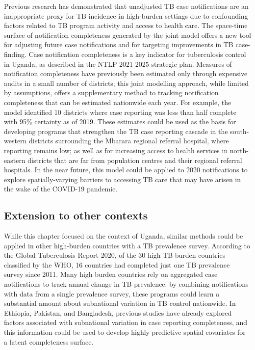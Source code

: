 \documentclass[
]{report}
\begin{document}
Previous research has demonstrated that unadjusted TB case notifications are an inappropriate proxy for TB incidence in high-burden settings due to confounding factors related to TB program activity and access to health care.\autocite{Rood2019,Shaweno2018} The space-time surface of notification completeness generated by the joint model offers a new tool for adjusting future case notifications and for targeting improvements in TB case-finding. Case notification completeness is a key indicator for tuberculosis control in Uganda, as described in the NTLP 2021-2025 strategic plan.\autocite{UgandaNationalTuberculosisandLeprosyProgramme2020a} Measures of notification completeness have previously been estimated only through expensive audits in a small number of districts; this joint modelling approach, while limited by assumptions, offers a supplementary method to tracking notification completeness that can be estimated nationwide each year. For example, the model identified 10 districts where case reporting was less than half complete with 95\% certainty as of 2019. These estimates could be used as the basis for developing programs that strengthen the TB case reporting cascade in the south-western districts surrounding the Mbarara regional referral hospital, where reporting remains low; as well as for increasing access to health services in north-eastern districts that are far from population centres and their regional referral hospitals. In the near future, this model could be applied to 2020 notifications to explore spatially-varying barriers to accessing TB care that may have arisen in the wake of the COVID-19 pandemic.\autocite{Togun2020}

\hypertarget{extension-to-other-contexts}{%
\subsection{Extension to other contexts}\label{extension-to-other-contexts}}

While this chapter focused on the context of Uganda, similar methods could be applied in other high-burden countries with a TB prevalence survey. According to the Global Tuberculosis Report 2020, of the 30 high TB burden countries classified by the WHO, 16 countries had completed just one TB prevalence survey since 2011.\autocite{WorldHealthOrganization2020a} Many high burden countries rely on aggregated case notifications to track annual change in TB prevalence: by combining notifications with data from a single prevalence survey, these programs could learn a substantial amount about subnational variation in TB control nationwide. In Ethiopia, Pakistan, and Bangladesh, previous studies have already explored factors associated with subnational variation in case reporting completeness, and this information could be used to develop highly predictive spatial covariates for a latent completeness surface.\autocite{Shaweno2017,Rood2019,VanGurp2020}
\end{document}
